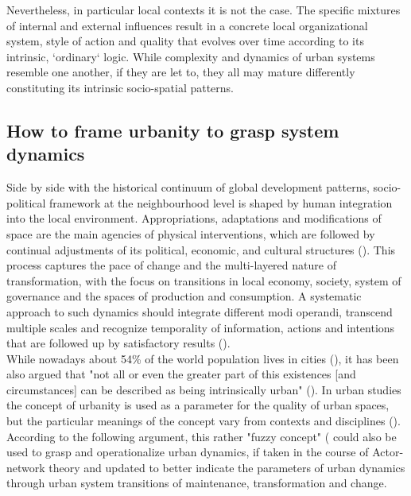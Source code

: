 \documentclass[11pt]{report}
\begin{document}
Nevertheless, in particular local contexts it is not the case. The specific mixtures of internal and external influences result in a concrete local organizational system, style of action and quality that evolves over time according to its intrinsic, `ordinary` logic.
While complexity and dynamics of urban systems resemble one another, if they are let to, they all may mature differently constituting its intrinsic socio-spatial patterns.

\subsection{How to frame urbanity to grasp system dynamics}

Side by side with the historical continuum of global development patterns, socio-political framework at the neighbourhood level is shaped by human integration into the local environment.
Appropriations, adaptations and modifications of space are the main agencies of physical interventions, which are followed by continual adjustments of its political, economic, and cultural structures (\href{Sykola}{\citealt{sykora_transitional_1999}}).
This process captures the pace of change and the multi-layered nature of transformation, with the focus on transitions in local economy, society, system of governance and the spaces of production and consumption.
A systematic approach to such dynamics should integrate different modi operandi, transcend multiple scales and recognize temporality of information, actions and intentions that are followed up by satisfactory results (\href{Tardin}{\citealt{tardin_landscape_2014}}).
\\

While nowadays about 54\% of the world population lives in cities (\href{UN}{\citealt{_world_2016}}), it has been also argued that "not all or even the greater part of this existences [and circumstances] can be described as being intrinsically urban"
(\href{Scott}{\citealt{scott_xxx_2015}}).
In urban studies the concept of urbanity is used as a parameter for the quality of urban spaces, but the particular meanings of the concept vary from contexts and disciplines (\citealt{(Bisson 2016}).
According to the following argument, this rather "fuzzy concept" (\cite{Bourdin, 2010} could also be used to grasp and operationalize urban dynamics, if taken in the course of Actor-network theory and updated to better indicate the parameters of urban dynamics through urban system transitions of maintenance, transformation and change.
\\
\end{document}
